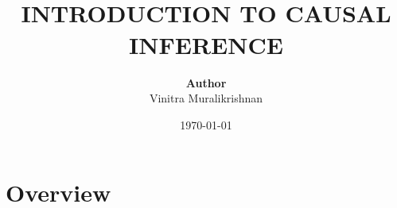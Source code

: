 \documentclass{article}
\begin{document}
\title{ \normalsize \textsc{}
		\\ [2.0cm]
		\LARGE \textbf{\uppercase{Introduction to Causal Inference}
        }
		}
\date{\today}

\author{\textbf{Author} \\ 
		Vinitra Muralikrishnan}

{\let\newpage\relax\maketitle}
\tableofcontents
\newpage

\section{Overview}
\end{document}
